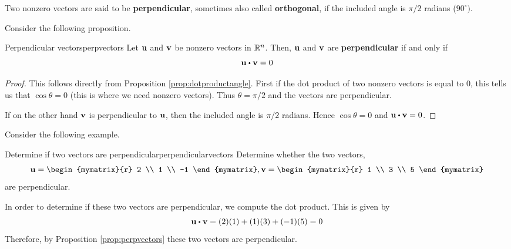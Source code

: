 Two nonzero  vectors are said to be \textbf{perpendicular}, sometimes also called \textbf{orthogonal}, if
the included angle is $\pi /2$ radians ($90^{\circ }).$

Consider the following proposition.

\begin{proposition}{Perpendicular vectors}{perpvectors}
Let ${\bf u}$ and ${\bf v}$ be nonzero vectors in $\mathbb{R}^n$. Then, 
${\bf u}$ and ${\bf v}$ are \textbf{perpendicular} if and only if
\begin{equation*}
\vect{u}
\dotprod
\vect{v}
=
0
\end{equation*}
\end{proposition}

\begin{proof}
This follows directly from Proposition \ref{prop:dotproductangle}. First if the dot product of
two nonzero vectors is equal to $0$, this tells us that $\cos \theta
=0$ (this is where we need nonzero vectors). Thus $\theta = \pi /2$
and the vectors are perpendicular.

If on the other hand ${\bf v}$ is perpendicular to ${\bf u}$, then 
the included angle is $\pi /2$ radians. Hence $\cos \theta =0$ and 
$\vect{u} \dotprod \vect{v} = 0$.
\end{proof}

Consider the following example.

\begin{example}{Determine if two vectors are perpendicular}{perpendicularvectors}
Determine whether the two vectors, 
\begin{equation*}
\vect{u}=
\begin{mymatrix}{r}
2 \\
1 \\
-1 
\end{mymatrix}, 
\vect{v} 
=
\begin{mymatrix}{r}
1 \\
3 \\
5
\end{mymatrix}
\end{equation*}
 are perpendicular.
\end{example}

\begin{solution}
In order to determine if these two vectors are perpendicular, we compute the dot product.
This is given by
\begin{equation*}
\vect{u} \dotprod \vect{v}
=
(2)(1) + (1)(3) + (-1)(5)
=
0
\end{equation*}
Therefore, by Proposition \ref{prop:perpvectors} these two vectors are perpendicular.
\end{solution}
